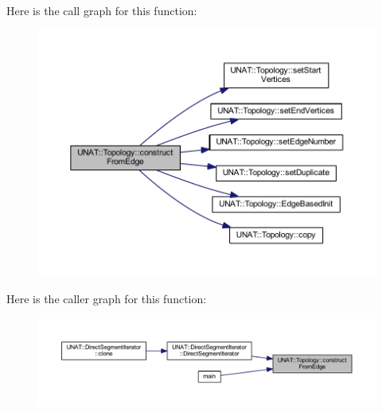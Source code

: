 Here is the call graph for this function\+:
\nopagebreak
\begin{figure}[H]
\begin{center}
\leavevmode
\includegraphics[width=350pt]{classUNAT_1_1Topology_a9765061db14035b0f624872d6855c470_cgraph}
\end{center}
\end{figure}
Here is the caller graph for this function\+:
\nopagebreak
\begin{figure}[H]
\begin{center}
\leavevmode
\includegraphics[width=350pt]{classUNAT_1_1Topology_a9765061db14035b0f624872d6855c470_icgraph}
\end{center}
\end{figure}
\mbox{\label{classUNAT_1_1Topology_a01e9873d9c9d7b585632a4fcef1bbd57}} 
